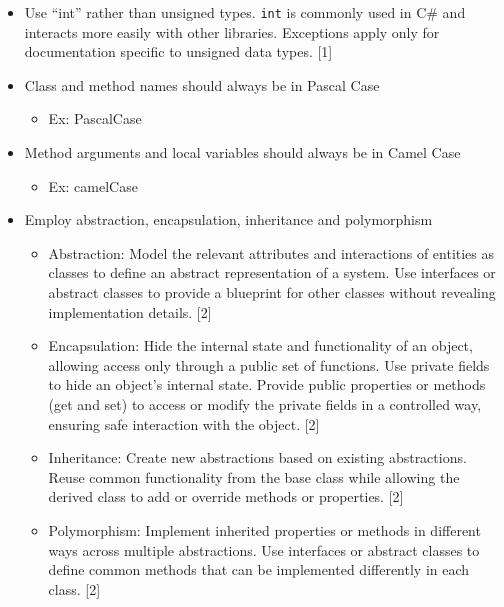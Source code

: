 \documentclass{article}
\begin{document}
\begin{itemize}

  \item Use ``int'' rather than unsigned types. \texttt{int} is commonly used in C\# and interacts more easily with other libraries. Exceptions apply only for documentation specific to unsigned data types. [1]
  \item Class and method names should always be in Pascal Case
  \begin{itemize}
    \item Ex: PascalCase
  \end{itemize}
  \item Method arguments and local variables should always be in Camel Case
  \begin{itemize}
    \item Ex: camelCase
  \end{itemize}
  \item Employ abstraction, encapsulation, inheritance and polymorphism

  \begin{itemize}
    \item Abstraction: Model the relevant attributes and interactions of entities as classes to define an abstract representation of a system. Use interfaces or abstract classes to provide a blueprint for other classes without revealing implementation details. [2]
    \item Encapsulation: Hide the internal state and functionality of an object, allowing access only through a public set of functions. Use private fields to hide an object's internal state. Provide public properties or methods (get and set) to access or modify the private fields in a controlled way, ensuring safe interaction with the object. [2]
    \item Inheritance: Create new abstractions based on existing abstractions. Reuse common functionality from the base class while allowing the derived class to add or override methods or properties. [2]
    \item Polymorphism: Implement inherited properties or methods in different ways across multiple abstractions. Use interfaces or abstract classes to define common methods that can be implemented differently in each class. [2]

  \end{itemize}


\end{itemize}
\end{document}
